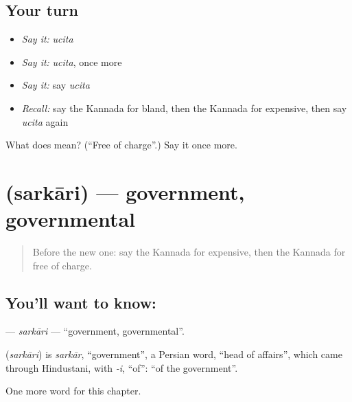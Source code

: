 \subsection*{Your turn}
\begin{itemize}
\raggedright
  \item \emph{Say it:} \emph{ucita}
  \item \emph{Say it:} \emph{ucita}, once more
  \item \emph{Say it:} say \emph{ucita}
  \item \emph{Recall:} say the Kannada for bland, then the Kannada for expensive, then say \emph{ucita} again
\end{itemize}

\begin{tcolorbox}[breakable,colback=teal!4,colframe=teal!35!black,title={Before you move on}]
What does  mean? (\textquotedblleft{}Free of charge\textquotedblright{}.) Say it once more.
\end{tcolorbox}
\section[\texorpdfstring{\kn{ಸರ್ಕಾರಿ} (sarkāri)}{ಸರ್ಕಾರಿ (sarkāri)}]{ (sarkāri) — government, governmental}

\label{lesson:KA-C180-sarkari}



\begin{quote}
Before the new one: say the Kannada for expensive, then the Kannada for free of charge.
\end{quote}

\subsection*{You'll want to know: }
\textbf{} — \emph{sarkāri} — \textquotedblleft{}government, governmental\textquotedblright{}.

\begin{cousinweb}
\textbf{} (\emph{sarkāri}) is \emph{sarkār}, \textquotedblleft{}government\textquotedblright{}, a Persian word, \textquotedblleft{}head of affairs\textquotedblright{}, which came through Hindustani, with \emph{-i}, \textquotedblleft{}of\textquotedblright{}: \textquotedblleft{}of the government\textquotedblright{}.
\end{cousinweb}

\begin{grammarlens}[title={What you've built}]
One more word for this chapter.
\end{grammarlens}


